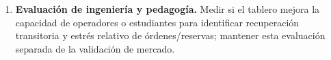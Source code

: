 \begin{enumerate}
  \item \textbf{Evaluación de ingeniería y pedagogía.} Medir si el tablero mejora la capacidad de operadores o estudiantes para identificar recuperación transitoria y estrés relativo de órdenes/reservas; mantener esta evaluación separada de la validación de mercado.
\end{enumerate}
